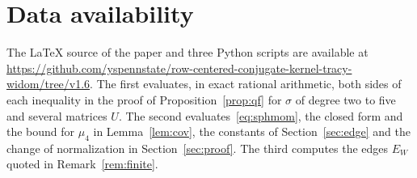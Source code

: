 \documentclass[11pt]{amsart}
\theoremstyle{remark}
\numberwithin{equation}{section}
\begin{document}
\section*{Data availability}
The \LaTeX{} source of the paper and three Python scripts are available at \url{https://github.com/yspennstate/row-centered-conjugate-kernel-tracy-widom/tree/v1.6}. The first evaluates, in exact rational arithmetic, both sides of each inequality in the proof of Proposition~\ref{prop:qf} for $\sigma$ of degree two to five and several matrices $U$. The second evaluates~\eqref{eq:sphmom}, the closed form and the bound for $\mu_4$ in Lemma~\ref{lem:cov}, the constants of Section~\ref{sec:edge} and the change of normalization in Section~\ref{sec:proof}. The third computes the edges $E_W$ quoted in Remark~\ref{rem:finite}.

\appendix

\end{document}
